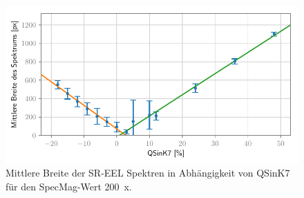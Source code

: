 \documentclass[
	paper=a4,				%
	twoside=true,			%
	BCOR=6mm,				%
	fontsize=12pt,			%
	pagesize=auto,			%
	numbers=noenddot,		%
	bibliography=totoc,		%
	draft=false
]{scrartcl}
\begin{document}
\begin{figure}
	\centering
	\includegraphics[width=1\textwidth]{../../Jupyter-Notebooks/Kapitel2/Bilder/QSinK7_SM200_width-vs-QSinK7}
	\caption{Mittlere Breite der SR-EEL Spektren in Abhängigkeit von QSinK7 für den SpecMag-Wert \SI{200}{x}.}
	\label{fig:SR-EELS_Charakterisierung_QSinK7_SM200_QSinK7}
\end{figure}

\clearpage



\end{document}
